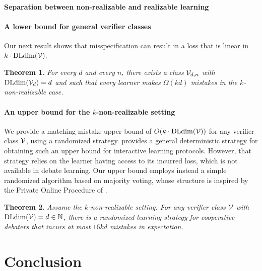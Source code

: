 \documentclass[11pt,letterpaper]{article}
\newtheorem{theorem}{Theorem}
\theoremstyle{definition}
\theoremstyle{plain}
\begin{document}
\paragraph{Separation between non-realizable and realizable learning}
\label{sec:agnostic-example}





\paragraph{A lower bound for general verifier classes}
Our next result shows that %
misspecification can result in a loss that is linear in $k\cdot \mathrm{DLdim}({\mathcal V})$.
\begin{theorem}\label{thm:kdlower}
    For every $d$ and every $n$, there exists a class ${\mathcal V}_{d,n}$ with $\mathrm{DLdim}({\mathcal V}_d)=d$ and such that every %
    learner makes $\Omega(kd)$ mistakes in the $k$-non-realizable case.
\end{theorem}

\paragraph{An upper bound for the $k$-non-realizable setting}
We provide a matching mistake upper bound of $O(k\cdot \mathrm{DLdim}({\mathcal V}))$ for any verifier class ${\mathcal V}$, using a randomized strategy. \cite{oz2026discriminative} provides a general deterministic strategy for obtaining such an upper bound for interactive learning protocols. However, that strategy relies on the learner having access to its incurred loss, which is not available in debate learning. 
Our upper bound employs instead a simple randomized algorithm based on majority voting, whose structure is inspired by the Private Online Procedure of \cite{kaplan2023black}. 

\begin{theorem}\label{thm:upperkd}
    Assume the $k$-non-realizable setting. For any verifier class ${\mathcal V}$ with $\mathrm{DLdim}({\mathcal V}) = d \in \mathbb{N}$, there is a randomized learning strategy for cooperative debaters that incurs at most $16kd$ mistakes in expectation. 
\end{theorem}


\section{Conclusion}
\end{document}
